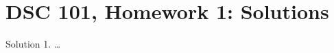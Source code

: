 \documentclass{article}
\begin{document}
\section*{DSC 101, Homework 1: Solutions}
Solution 1. \dots
\end{document}
